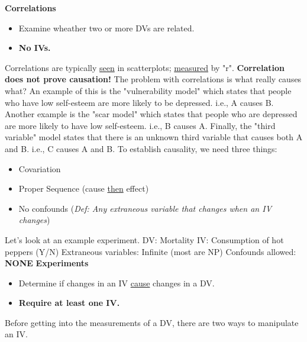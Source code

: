 \documentclass[11pt]{report}
\begin{document}
\textbf{Correlations}
\begin{itemize}
    \item Examine wheather two or more DVs are related.
    \item \textbf{No IVs.}
\end{itemize}
Correlations are typically \underline{seen} in scatterplots; \underline{measured} by "r". 
\newline\newline
\textbf{Correlation does not prove causation!} The problem with correlations is what really causes what?
An example of this is the "vulnerability model" which states that people who have low self-esteem are more likely to be depressed. i.e., A causes B.
Another example is the "scar model" which states that people who are depressed are more likely to have low self-esteem. i.e., B causes A.
Finally, the "third variable" model states that there is an unknown third variable that causes both A and B. i.e., C causes A and B.
\newline\newline
To establish causality, we need three things:
\begin{itemize}
    \item Covariation
    \item Proper Sequence (cause \underline{then} effect)
    \item No confounds (\textit{Def: Any extraneous variable that changes when an IV changes})
\end{itemize}
Let's look at an example experiment. 
{
DV: Mortality \newline 
IV: Consumption of hot peppers (Y/N) \newline
Extraneous variables: Infinite (most are NP) \newline 
Confounds allowed: \textbf{NONE}
}
\noindent\textbf{Experiments}
\begin{itemize}
    \item Determine if changes in an IV \underline{cause} changes in a DV.
    \item \textbf{Require at least one IV.} 
\end{itemize}

\noindent Before getting into the measurements of a DV, there are two ways to manipulate an IV.
\end{document}
